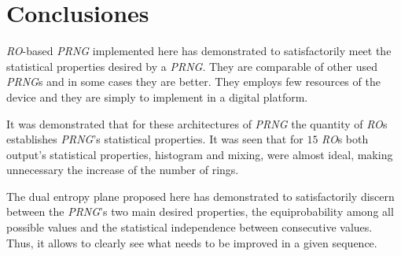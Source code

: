 \section{Conclusiones}
\label{sec:conclusions}
\emph{RO}-based \emph{PRNG} implemented here has demonstrated to satisfactorily meet the statistical properties desired by a \emph{PRNG}. They are comparable of other used \emph{PRNG}s and in some cases they are better. They employs few resources of the device and they are simply to implement in a digital platform.

It was demonstrated that for these architectures of \emph{PRNG} the quantity of
\emph{RO}s establishes \emph{PRNG}'s statistical properties. It was seen that
for $15$ \emph{RO}s both output's statistical properties, histogram
and mixing, were almost ideal, making unnecessary the increase of the number of rings.

The dual entropy plane proposed here has demonstrated to satisfactorily discern between the \emph{PRNG}'s two main desired properties, the equiprobability among all possible values and the statistical independence between consecutive values. Thus, it allows to clearly see what needs to be improved in a given sequence.